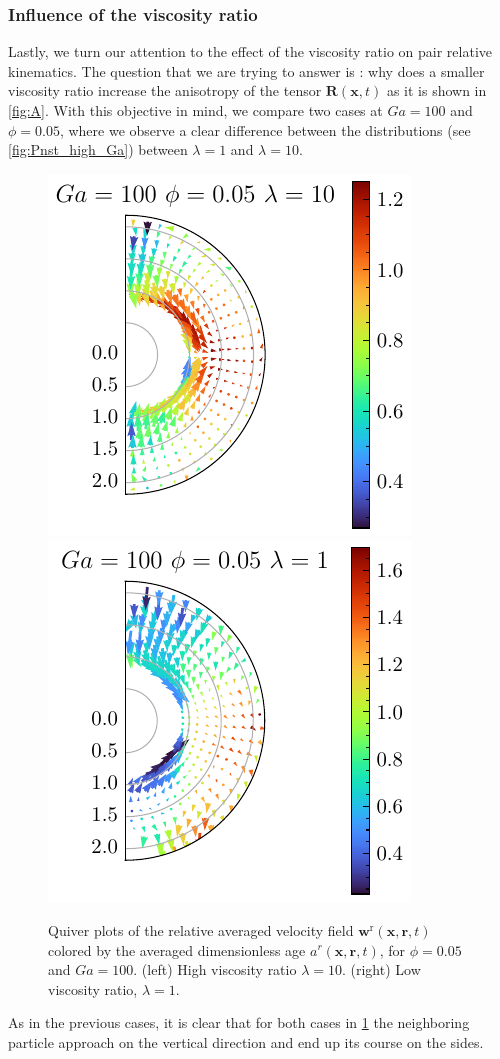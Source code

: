 \subsubsection*{Influence of the viscosity ratio}

Lastly, we turn our attention to the effect of the viscosity ratio on pair relative kinematics. 
The question that we are trying to answer is : why does a smaller viscosity ratio increase the anisotropy of the tensor $\textbf{R}(\textbf{x},t)$ as it is shown in \ref{fig:A}. 
With this objective in mind, we compare two cases at $Ga = 100$ and $\phi =0.05$, where we observe a clear difference between the distributions (see \ref{fig:Pnst_high_Ga}) between $\lambda = 1$ and $\lambda = 10$.
\begin{figure}[h!]
    \centering
    \includegraphics[height=0.35\textwidth]{image/HOMOGENEOUS_NEW/Dist/U_rel_l_10_Ga_100_PHI_5.pdf}
    \includegraphics[height=0.35\textwidth]{image/HOMOGENEOUS_NEW/Dist/U_rel_l_1_Ga_100_PHI_5.pdf}
    \caption{Quiver plots of the relative averaged velocity field $\textbf{w}^\text{r}(\textbf{x},\textbf{r},t)$ colored by the averaged dimensionless age $a^r(\textbf{x},\textbf{r},t)$, for $\phi = 0.05$ and $Ga = 100$. 
    (left) High viscosity ratio $\lambda = 10$.
    (right) Low viscosity ratio, $\lambda = 1$. }
    \label{fig:Why_l_matter}
\end{figure}
As in the previous cases, it is clear that for both cases in \ref{fig:Why_l_matter} the neighboring particle approach on the vertical direction and end up its course on the sides.
